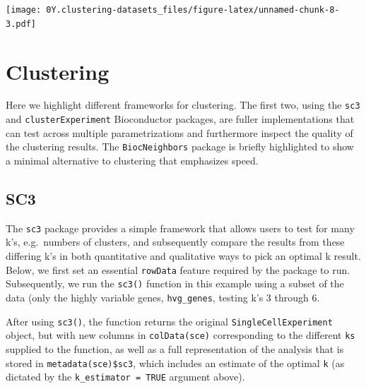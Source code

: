 \documentclass[]{book}
\newenvironment{Shaded}{\begin{snugshade}}{\end{snugshade}}
\newcommand{\CommentTok}[1]{\textcolor[rgb]{0.56,0.35,0.01}{\textit{#1}}}
\newcommand{\DataTypeTok}[1]{\textcolor[rgb]{0.13,0.29,0.53}{#1}}
\newcommand{\DecValTok}[1]{\textcolor[rgb]{0.00,0.00,0.81}{#1}}
\newcommand{\KeywordTok}[1]{\textcolor[rgb]{0.13,0.29,0.53}{\textbf{#1}}}
\newcommand{\NormalTok}[1]{#1}
\newcommand{\OperatorTok}[1]{\textcolor[rgb]{0.81,0.36,0.00}{\textbf{#1}}}
\newcommand{\OtherTok}[1]{\textcolor[rgb]{0.56,0.35,0.01}{#1}}
\newcommand{\StringTok}[1]{\textcolor[rgb]{0.31,0.60,0.02}{#1}}
\begin{document}
\texttt{[image: 0Y.clustering-datasets\_files/figure-latex/unnamed-chunk-8-3.pdf]}

\hypertarget{clustering-1}{%
\section{Clustering}\label{clustering-1}}

Here we highlight different frameworks for clustering. The first two, using the \texttt{sc3} and \texttt{clusterExperiment} Bioconductor packages, are fuller implementations that can test across multiple parametrizations and furthermore inspect the quality of the clustering results. The \texttt{BiocNeighbors} package is briefly highlighted to show a minimal alternative to clustering that emphasizes speed.

\hypertarget{sc3}{%
\subsection{SC3}\label{sc3}}

The \texttt{sc3} package provides a simple framework that allows users to test for many k's, e.g.~numbers of clusters, and subsequently compare the results from these differing k's in both quantitative and qualitative ways to pick an optimal k result. Below, we first set an essential \texttt{rowData} feature required by the package to run. Subsequently, we run the \texttt{sc3()} function in this example using a subset of the data (only the highly variable genes, \texttt{hvg\_genes}, testing k's 3 through 6.

\begin{Shaded}
\end{Shaded}

After using \texttt{sc3()}, the function returns the original \texttt{SingleCellExperiment} object, but with new columns in \texttt{colData(sce)} corresponding to the different \texttt{ks} supplied to the function, as well as a full representation of the analysis that is stored in \texttt{metadata(sce)\$sc3}, which includes an estimate of the optimal \texttt{k} (as dictated by the \texttt{k\_estimator\ =\ TRUE} argument above).
\end{document}
